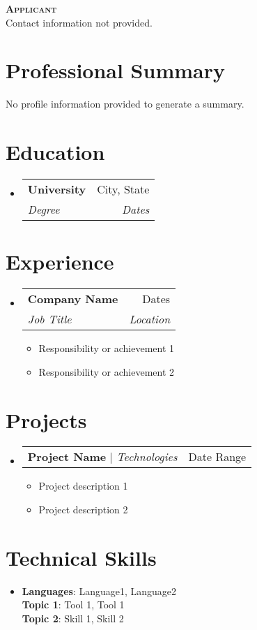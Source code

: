 \documentclass[letterpaper,11pt]{article}
\makeatletter
\newcommand{\resumeItem}[1]{
\item\small{
{#1 \vspace{-2pt}}
}
}
\newcommand{\resumeSubheading}[4]{
\vspace{-2pt}\item
\begin{tabular*}{0.97\textwidth}[t]{l@{\extracolsep{\fill}}r}
\textbf{#1} & #2 \\
\textit{\small#3} & \textit{\small #4} \\
\end{tabular*}\vspace{-7pt}
}
\newcommand{\resumeProjectHeading}[2]{
\item
\begin{tabular*}{0.97\textwidth}{l@{\extracolsep{\fill}}r}
\small#1 & #2 \\
\end{tabular*}\vspace{-7pt}
}
\newcommand{\resumeSubHeadingListStart}{\begin{itemize}[leftmargin=0.15in, label={}]}
\newcommand{\resumeSubHeadingListEnd}{\end{itemize}}
\newcommand{\resumeItemListStart}{\begin{itemize}}
\newcommand{\resumeItemListEnd}{\end{itemize}\vspace{-5pt}}
\makeatother
\begin{document}
\begin{center}
\textbf{\Huge \scshape Applicant} \\ \vspace{1pt}
\small Contact information not provided.
\end{center}


\section{Professional Summary} %
No profile information provided to generate a summary.

\section{Education}
\resumeSubHeadingListStart
\resumeSubheading{University}{City, State}{Degree}{Dates}
\resumeSubHeadingListEnd

\section{Experience}
\resumeSubHeadingListStart
\resumeSubheading{Company Name}{Dates}{Job Title}{Location}
\resumeItemListStart
\resumeItem{Responsibility or achievement 1}
\resumeItem{Responsibility or achievement 2}
\resumeItemListEnd
\resumeSubHeadingListEnd

\section{Projects}
\resumeSubHeadingListStart
\resumeProjectHeading{\textbf{Project Name} $|$ \emph{Technologies}}{Date Range}
\resumeItemListStart
\resumeItem{Project description 1}
\resumeItem{Project description 2}
\resumeItemListEnd
\resumeSubHeadingListEnd

\section{Technical Skills} %
\begin{itemize}[leftmargin=0.15in, label={}]
\item{
\textbf{Languages}{: Language1, Language2} \\
\textbf{Topic 1}{: Tool 1, Tool 1} \\
\textbf{Topic 2}{: Skill 1, Skill 2}
} \\
\end{itemize}


\end{document}
